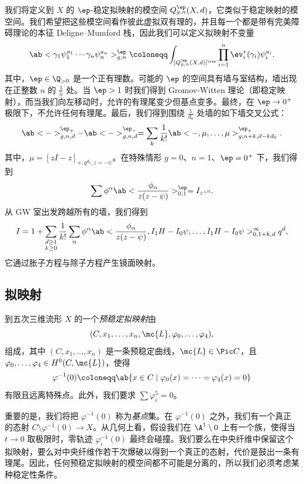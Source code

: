 我们将定义到 \(X\) 的 \(\ep\)-稳定拟映射的模空间 \(Q_{g,n}^{\ep}(X, d)\)，它类似于稳定映射的模空间。我们希望把这些模空间看作彼此虚拟双有理的，并且每一个都是带有完美障碍理论的本征 Deligne–Mumford 栈，因此我们可以定义拟映射不变量
\[ \ab< \gamma_1 \psi_1^{a_1} \cdots \gamma_n \psi_n^{a_n}>_{g,n}^{\ep} \coloneqq \int_{[Q_{g,n}^{\ep}(X,d)]^{\vir}} \prod_{i=1}^n \ev_i^*(\gamma_i) \psi_i^{a_i}. \]
其中，\(\ep \in \Q_{>0}\) 是一个正有理数。可能的 \(\ep\) 的空间具有墙与室结构，墙出现在正整数 \(n\) 的 \(\frac{1}{n}\) 处。当 \(\ep > 1\) 时我们得到 Gromov-Witten 理论（即稳定映射），而当我们向左移动时，允许的有理尾变少但基点变多。最终，在 \(\ep \to 0^+\) 极限下，不允许任何有理尾。最后，我们得到围绕 \(\frac{1}{d_0}\) 处墙的如下墙交叉公式：
\[ \ab<->_{g,n,d}^{\ep_+} - \ab<->_{g,n,d}^{\ep_-} = \sum_{k} \frac{1}{k!} \ab<-, \mu, \ldots, \mu>_{g,n+k, d-kd_0}^{\ep_+}. \]
其中，\(\mu = [zI-z]_{+, q^{d_0}, z=-\psi}\)。在特殊情形 \(g = 0\)、\(n = 1\)、\(\ep = 0^+\) 下，我们得到
\[ \sum \phi^{\alpha} \ab<\frac{\phi_{\alpha}}{z(z-\psi)}>^{\ep}_{0,1} = I_{z^{<0}}. \]
从 GW 室出发跨越所有的墙，我们得到
\[ I = 1 + \sum_{\substack{d \geq 1 \\ k \geq 0}} \frac{1}{k!} \sum_{\alpha} \phi^{\alpha} \ab< \frac{\phi_{\alpha}}{z(z-\psi)}, I_1 H - I_0 \psi, \ldots, I_1 H - I_0 \psi>_{0,1+k,d}^{\infty} q^d, \]
它通过胀子方程与除子方程产生镜面映射。

\subsection{拟映射}%
\label{sub:Quasimaps}

\begin{defn}
    到五次三维流形 \(X\) 的一个\textit{预稳定拟映射}由
    \[(C, x_1, \ldots, x_n, \mc{L}, \varphi_0, \ldots, \varphi_4),\] 
    组成，其中 \((C, x_1, \ldots, x_n)\) 是一条预稳定曲线，\(\mc{L} \in \Pic C\)，且 \(\varphi_0, \ldots, \varphi_4 \in H^0(C, \mc{L})\)，使得
    \[ \varphi^{-1}(0) \coloneqq \ab\{x \in C \mid \varphi_0(x) = \cdots = \varphi_4(x) = 0 \} \]
    有限且远离特殊点。此外，我们要求 \(\sum \varphi_i^5 = 0\)。
\end{defn}

重要的是，我们将把 \(\varphi^{-1}(0)\) 称为\textit{基点}集。在 \(\varphi^{-1}(0)\) 之外，我们有一个真正的态射 \(C \setminus \varphi^{-1}(0) \to X\)。从几何上看，假设我们在 \(\A^1 \setminus 0\) 上有一个族，使得当 \(t \to 0\) 取极限时，零轨迹 \(\varphi_i^{-1}(0)\) 最终会碰撞。我们要么在中央纤维中保留这个拟映射，要么对中央纤维作若干次爆破以得到一个真正的态射，代价是鼓出一条有理尾。因此，任何预稳定拟映射的模空间都不可能是分离的，所以我们必须考虑某种稳定性条件。

